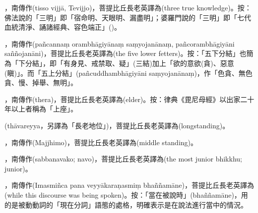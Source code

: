 \startitemgroup[noteitems]
\item{}，南傳作(tisso vijjā, Tevijjo)，菩提比丘長老英譯為(three true knowledge)。按：佛法說的「三明」即「宿命明、天眼明、漏盡明」；婆羅門說的「三明」即「七代血統清淨、誦諸經典、容色端正」()。
\stopitemgroup

\startitemgroup[noteitems]
\item{}，南傳作(pañcannaṃ orambhāgiyānaṃ saṃyojanānaṃ, pañcorambhāgiyāni saññojanāni)，菩提比丘長老英譯為(the five lower fetters)。按：「五下分結」也簡為「下分結」，即「有身見、戒禁取、疑」(三結)加上「欲的意欲(貪)、惡意(瞋)」。而「五上分結」(pañcuddhambhāgiyāni saṃyojanānaṃ)，作「色貪、無色貪、慢、掉舉、無明」。
\stopitemgroup

\startitemgroup[noteitems]
\item{}，南傳作(thera)，菩提比丘長老英譯為(elder)。按：律典《毘尼母經》以出家二十年以上者稱為「上座」。
\item{}(thāvareyya，另譯為「長老地位」)，菩提比丘長老英譯為(longstanding)。
\item{}，南傳作(Majjhimo)，菩提比丘長老英譯為(middle standing)。
\item{}，南傳作(sabbanavako; navo)，菩提比丘長老英譯為(the most junior bhikkhu; junior)。
\stopitemgroup

\startitemgroup[noteitems]
\item{}，南傳作(Imasmiñca pana veyyākaraṇasmiṃ bhaññamāne)，菩提比丘長老英譯為(while this discourse was being spoken)。按：「當在被說時」(bhaññamāne)，用的是被動動詞的「現在分詞」語態的處格，明確表示是在說法進行當中的情況。
\stopitemgroup

